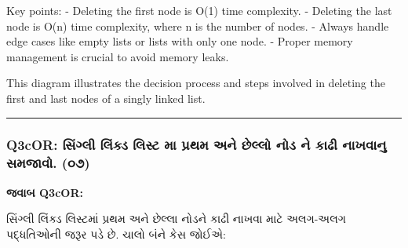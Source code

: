 Key points: - Deleting the first node is O(1) time complexity. -
Deleting the last node is O(n) time complexity, where n is the number of
nodes. - Always handle edge cases like empty lists or lists with only
one node. - Proper memory management is crucial to avoid memory leaks.

\begin{Shaded}
\begin{Highlighting}[]
\end{Highlighting}
\end{Shaded}

This diagram illustrates the decision process and steps involved in
deleting the first and last nodes of a singly linked list.

\begin{center}\rule{0.5\linewidth}{0.5pt}\end{center}

\hypertarget{q3cor-uxab8uxa97uxab2-uxab2uxa95uxaa1-uxab2uxab8uxa9f-uxaae-uxaaauxab0uxaa5uxaae-uxa85uxaa8-uxa9buxab2uxab2-uxaa8uxaa1-uxaa8-uxa95uxaa2-uxaa8uxa96uxab5uxaa8-uxab8uxaaeuxa9cuxab5.-uxae6uxaed}{%
\subsubsection{\texorpdfstring{Q3cOR: સિંગ્લી લિંક્ડ લિસ્ટ મા પ્રથમ અને છેલ્લો
નોડ ને કાઢી નાખવાનુ સમજાવો.
(\textbf{૦૭})}{Q3cOR: સિંગ્લી લિંક્ડ લિસ્ટ મા પ્રથમ અને છેલ્લો નોડ ને કાઢી નાખવાનુ સમજાવો. (૦૭)}}\label{q3cor-uxab8uxa97uxab2-uxab2uxa95uxaa1-uxab2uxab8uxa9f-uxaae-uxaaauxab0uxaa5uxaae-uxa85uxaa8-uxa9buxab2uxab2-uxaa8uxaa1-uxaa8-uxa95uxaa2-uxaa8uxa96uxab5uxaa8-uxab8uxaaeuxa9cuxab5.-uxae6uxaed}}

\textbf{જવાબ Q3cOR:}

સિંગ્લી લિંક્ડ લિસ્ટમાં પ્રથમ અને છેલ્લા નોડને કાઢી નાખવા માટે અલગ-અલગ પદ્ધતિઓની જરૂર
પડે છે. ચાલો બંને કેસ જોઈએ:

